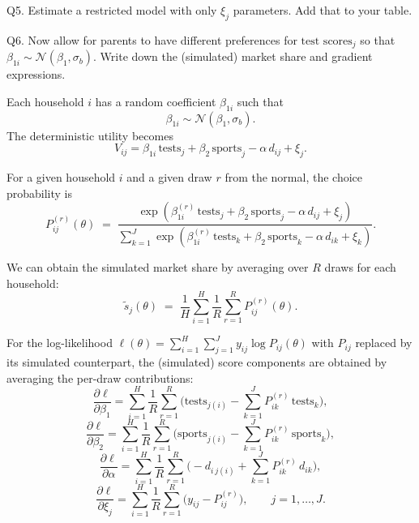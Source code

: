 \documentclass{article}
\begin{document}
\begin{tcolorbox}
Q5. Estimate a restricted model with only $\xi_j$ parameters. Add that to your table.
\end{tcolorbox}

\begin{table}[H]
\centering
{}
\caption{Estimation results for logit models.}
\end{table}

\begin{tcolorbox}
Q6. Now allow for parents to have different preferences for $\text{test scores}_j$ so that $\beta_{1i} \sim \mathcal{N}(\beta_1, \sigma_b)$. Write down the (simulated) market share and gradient expressions.
\end{tcolorbox}

Each household $i$ has a random coefficient $\beta_{1i}$ such that
\[
\beta_{1i} \sim \mathcal{N}(\beta_1,\sigma_b).
\]
The deterministic utility becomes
\[
V_{ij} = \beta_{1i}\,\text{tests}_j + \beta_2\,\text{sports}_j - \alpha\,d_{ij} + \xi_j.
\]

For a given household $i$ and a given draw $r$ from the normal, the choice probability is
\[
P_{ij}^{(r)}(\theta) \;=\; \frac{\exp\!\left(\beta_{1i}^{(r)}\,\text{tests}_j + \beta_2\,\text{sports}_j - \alpha\,d_{ij} + \xi_j\right)}
{\sum_{k=1}^J \exp\!\left(\beta_{1i}^{(r)}\,\text{tests}_k + \beta_2\,\text{sports}_k - \alpha\,d_{ik} + \xi_k\right)}.
\]

We can obtain the simulated market share by averaging over $R$ draws for each household:
\[
\tilde s_j(\theta) \;=\; \frac{1}{H}\sum_{i=1}^H \frac{1}{R} \sum_{r=1}^R P_{ij}^{(r)}(\theta).
\]

For the log-likelihood $\ell(\theta)=\sum_{i=1}^H\sum_{j=1}^J y_{ij}\log P_{ij}(\theta)$ with $P_{ij}$ replaced by its simulated counterpart, the (simulated) score components are obtained by averaging the per-draw contributions:
\[
\frac{\partial \ell}{\partial \beta_1}
=\sum_{i=1}^H \frac{1}{R}\sum_{r=1}^R 
\Big( \text{tests}_{j(i)} - \sum_{k=1}^J P_{ik}^{(r)}\,\text{tests}_k \Big),
\]
\[
\frac{\partial \ell}{\partial \beta_2}
=\sum_{i=1}^H \frac{1}{R}\sum_{r=1}^R 
\Big( \text{sports}_{j(i)} - \sum_{k=1}^J P_{ik}^{(r)}\,\text{sports}_k \Big),
\]
\[
\frac{\partial \ell}{\partial \alpha}
=\sum_{i=1}^H \frac{1}{R}\sum_{r=1}^R 
\Big( -d_{i\,j(i)} + \sum_{k=1}^J P_{ik}^{(r)}\,d_{ik} \Big),
\]
\[
\frac{\partial \ell}{\partial \xi_j}
=\sum_{i=1}^H \frac{1}{R}\sum_{r=1}^R \big( y_{ij} - P_{ij}^{(r)} \big), 
\qquad j=1,\ldots,J.
\]
\end{document}
